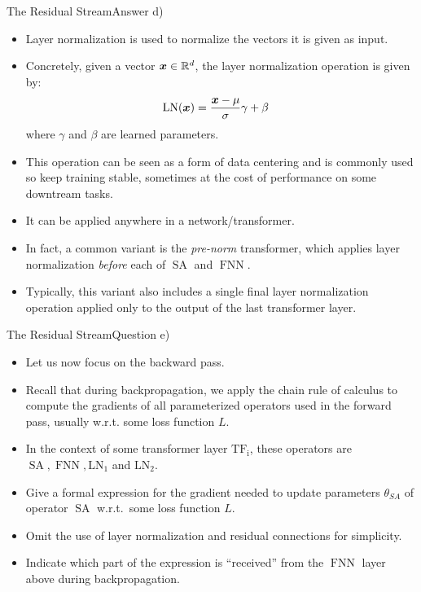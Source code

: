 \documentclass[t]{beamer}
\newcommand\op[1]{\operatorname{#1}}
\begin{document}
\begin{frame}{The Residual Stream}{Answer d)}
    \begin{itemize}
        \item Layer normalization is used to normalize the vectors it is given
              as input.
        \item Concretely, given a vector ${\boldsymbol{x}}\in\mathbb{R}^d$, the layer
              normalization operation is given by:
              \begin{align}
                  \op{LN}(\vx) & = \frac{\vx - \mu}{\sigma} \gamma + \beta
              \end{align}
              where $\gamma$ and $\beta$ are learned parameters.
        \item This operation can be seen as a form of data centering and is
              commonly used so keep training stable, sometimes at the cost of
              performance on some downtream tasks.
        \item It can be applied anywhere in a network/transformer.
        \item In fact, a common variant is the \emph{pre-norm} transformer,
              which applies layer normalization \emph{before} each of $\op{SA}$
              and $\op{FNN}$.
        \item Typically, this variant also includes a single final layer
              normalization operation applied only to the output of the last
              transformer layer.
    \end{itemize}
\end{frame}

\begin{frame}{The Residual Stream}{Question e)}
    \begin{itemize}
        \item Let us now focus on the backward pass.
        \item Recall that during backpropagation, we apply the chain rule of
              calculus to compute the gradients of all parameterized operators
              used in the forward pass, usually w.r.t. some loss function $L$.
        \item In the context of some transformer layer $\op{TF_i}$, these
              operators are $\op{SA},\op{FNN},\op{LN_1}$ and $\op{LN_2}$.
        \item Give a formal expression for the gradient needed to update
              parameters $\theta_{SA}$ of operator $\op{SA}$ w.r.t.\ some loss
              function $L$.
        \item Omit the use of layer normalization and residual connections for
              simplicity.
        \item Indicate which part of the expression is ``received'' from the
              $\op{FNN}$ layer above during backpropagation.
    \end{itemize}
\end{frame}
\end{document}
